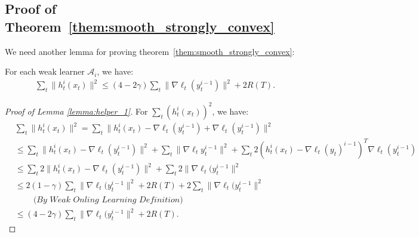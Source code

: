 \subsection{Proof of Theorem~\ref{them:smooth_strongly_convex}}
We need another lemma for proving theorem~\ref{them:smooth_strongly_convex}:
\begin{lemma}
\label{lemma:helper_1}
For each weak learner $\mathcal{A}_i$, we have:
\begin{align}
\sum_t \|h_t^i(x_t)\|^2 \leq (4-2\gamma)\sum_t\|\nabla\ell_t(y_t^{i-1})\|^2 + 2R(T).
\end{align}
\end{lemma}
\begin{proof}[Proof of Lemma \ref{lemma:helper_1}] For $\sum_t (h_t^i(x_t))^2$, we have:
\begin{align}
&\sum_t\|h_t^i(x_t)\|^2 = \sum_t \|h_t^i(x_t) - \nabla\ell_t(y_t^{i-1}) + \nabla\ell_t(y_t^{i-1})\|^2 \nonumber \\
& \leq \sum_t \|h_t^i(x_t)-\nabla\ell_t(y_t^{i-1})\|^2 + \sum_t\|\nabla\ell_ty_t^{i-1}\|^2 + \sum_t 2(h_t^i(x_t) - \nabla\ell_t(y_t)^{i-1})^T\nabla\ell_t(y_t^{i-1}) \nonumber \\
& \leq  \sum_t 2\|h_t^i(x_t)-\nabla\ell_t(y_t^{i-1})\|^2 + \sum_t2 \|\nabla\ell_t(y_t^{i-1}\|^2 \nonumber \\
& \leq 2(1-\gamma)\sum_t\|\nabla\ell_t(y_t^{i-1}\|^2 +2R(T) + 2\sum_t\|\nabla\ell_t(y_t^{i-1}\|^2 \nonumber \\
& \;\;\;\;\;\;\;\; \textit{(By Weak Onling Learning Definition)} \nonumber \\
& \leq (4-2\gamma)\sum_t\|\nabla\ell_t(y_t^{i-1}\|^2 + 2R(T).
\end{align}
\end{proof}


